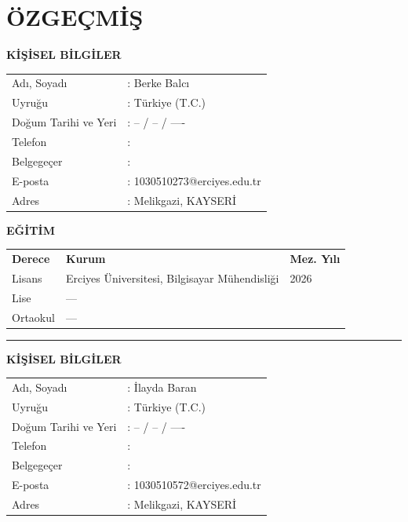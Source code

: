 \documentclass[12pt, a4paper]{report}
\begin{document}
\chapter*{ÖZGEÇMİŞ}

\noindent\textbf{KİŞİSEL BİLGİLER}

\vspace{0.5cm}
\begin{tabular}{ll}
  Adı, Soyadı          & : Berke Balcı \\[4pt]
  Uyruğu               & : Türkiye (T.C.) \\[4pt]
  Doğum Tarihi ve Yeri & : -- / -- / ---- \\[4pt]
  Telefon              & : \\[4pt]
  Belgegeçer           & : \\[4pt]
  E-posta              & : 1030510273@erciyes.edu.tr \\[4pt]
  Adres                & : Melikgazi, KAYSERİ \\
\end{tabular}

\vspace{0.8cm}
\noindent\textbf{EĞİTİM}

\vspace{0.3cm}
\begin{tabular}{lll}
  \textbf{Derece} & \textbf{Kurum}                                 & \textbf{Mez. Yılı} \\[3pt]
  Lisans          & Erciyes Üniversitesi, Bilgisayar Mühendisliği  & 2026 \\[3pt]
  Lise            & ---                                            & \\
  Ortaokul        & ---                                            & \\
\end{tabular}

\vspace{1.5cm}
\noindent\rule{\linewidth}{0.5pt}
\vspace{0.5cm}

\noindent\textbf{KİŞİSEL BİLGİLER}

\vspace{0.5cm}
\begin{tabular}{ll}
  Adı, Soyadı          & : İlayda Baran \\[4pt]
  Uyruğu               & : Türkiye (T.C.) \\[4pt]
  Doğum Tarihi ve Yeri & : -- / -- / ---- \\[4pt]
  Telefon              & : \\[4pt]
  Belgegeçer           & : \\[4pt]
  E-posta              & : 1030510572@erciyes.edu.tr \\[4pt]
  Adres                & : Melikgazi, KAYSERİ \\
\end{tabular}
\end{document}
